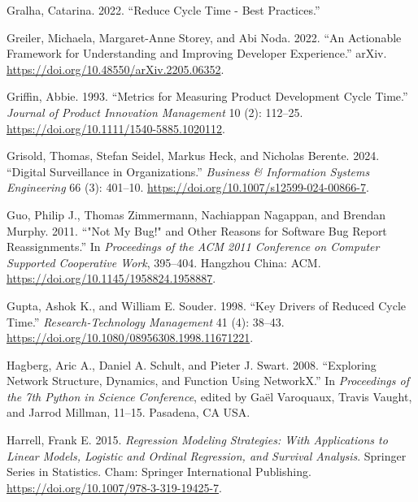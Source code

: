 \documentclass[
]{article}
\newlength{\cslhangindent}
\newenvironment{CSLReferences}[2] %
 {\begin{list}{}{%
  \setlength{\itemindent}{0pt}
  \setlength{\leftmargin}{0pt}
  \setlength{\parsep}{0pt}
  \ifodd #1
   \setlength{\leftmargin}{\cslhangindent}
   \setlength{\itemindent}{-1\cslhangindent}
  \fi
  \setlength{\itemsep}{#2\baselineskip}}}
 {\end{list}}
\begin{document}
\begin{CSLReferences}{1}{0}
Gralha, Catarina. 2022. {``Reduce Cycle Time - Best Practices.''}

Greiler, Michaela, Margaret-Anne Storey, and Abi Noda. 2022. {``An
{Actionable Framework} for {Understanding} and {Improving Developer
Experience}.''} arXiv. \url{https://doi.org/10.48550/arXiv.2205.06352}.

Griffin, Abbie. 1993. {``Metrics for {Measuring Product Development
Cycle Time}.''} \emph{Journal of Product Innovation Management} 10 (2):
112--25. \url{https://doi.org/10.1111/1540-5885.1020112}.

Grisold, Thomas, Stefan Seidel, Markus Heck, and Nicholas Berente. 2024.
{``Digital {Surveillance} in {Organizations}.''} \emph{Business \&
Information Systems Engineering} 66 (3): 401--10.
\url{https://doi.org/10.1007/s12599-024-00866-7}.

Guo, Philip J., Thomas Zimmermann, Nachiappan Nagappan, and Brendan
Murphy. 2011. {``"{Not} My Bug!" and Other Reasons for Software Bug
Report Reassignments.''} In \emph{Proceedings of the {ACM} 2011
Conference on {Computer} Supported Cooperative Work}, 395--404. Hangzhou
China: ACM. \url{https://doi.org/10.1145/1958824.1958887}.

Gupta, Ashok K., and William E. Souder. 1998. {``Key {Drivers} of
{Reduced Cycle Time}.''} \emph{Research-Technology Management} 41 (4):
38--43. \url{https://doi.org/10.1080/08956308.1998.11671221}.

Hagberg, Aric A., Daniel A. Schult, and Pieter J. Swart. 2008.
{``Exploring Network Structure, Dynamics, and Function Using
{NetworkX}.''} In \emph{Proceedings of the 7th Python in Science
Conference}, edited by Gaël Varoquaux, Travis Vaught, and Jarrod
Millman, 11--15. Pasadena, CA USA.

Harrell, Frank E. 2015. \emph{Regression {Modeling Strategies}: {With
Applications} to {Linear Models}, {Logistic} and {Ordinal Regression},
and {Survival Analysis}}. Springer {Series} in {Statistics}. Cham:
Springer International Publishing.
\url{https://doi.org/10.1007/978-3-319-19425-7}.


\end{CSLReferences}
\end{document}
